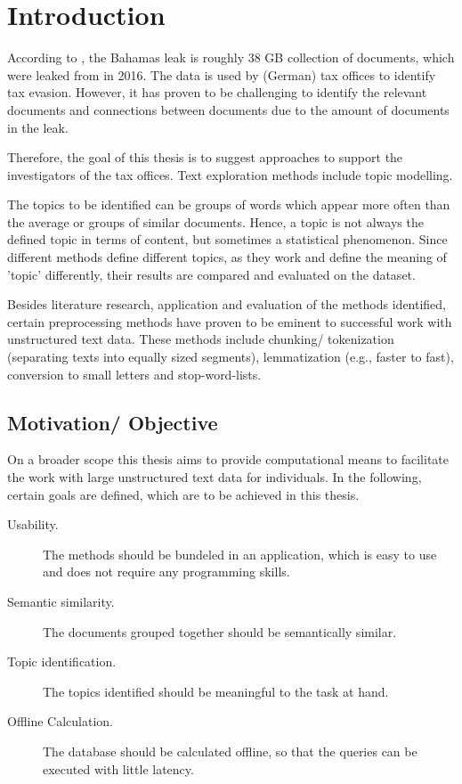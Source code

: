 \chapter{Introduction}\label{ch:introduction}

According to \cite{data-corpus-bahamas-leaks}, the Bahamas leak is roughly 38 GB collection of documents, which were leaked from in 2016.
The data is used by (German) tax offices to identify tax evasion.
However, it has proven to be challenging to identify the relevant documents and connections between documents due to the amount of documents in the leak.

Therefore, the goal of this thesis is to suggest approaches to support the investigators of the tax offices.
Text exploration methods include topic modelling.

The topics to be identified can be groups of words which appear more often than the average or groups of similar documents.
Hence, a topic is not always the defined topic in terms of content, but sometimes a statistical phenomenon.
Since different methods define different topics, as they work and define the meaning of 'topic' differently, 
their results are compared and evaluated on the dataset.

Besides literature research, application and evaluation of the methods identified, 
certain preprocessing methods have proven to be eminent to successful work with unstructured text data.
These methods include chunking/ tokenization (separating texts into equally sized segments), lemmatization (e.g., faster to fast), 
conversion to small letters and stop-word-lists.

\section{Motivation/ Objective}\label{sec:motivation}

On a broader scope this thesis aims to provide computational means to facilitate the work with large unstructured text data for individuals.
In the following, certain goals are defined, which are to be achieved in this thesis.

\begin{description}
    \item[Usability.]
    The methods should be bundeled in an application, which is easy to use and does not require any programming skills.
    \item[Semantic similarity.]
    The documents grouped together should be semantically similar.
    \item[Topic identification.]
    The topics identified should be meaningful to the task at hand.  
    \item[Offline Calculation.]
    The database should be calculated offline, so that the queries can be executed with little latency.
\end{description}


